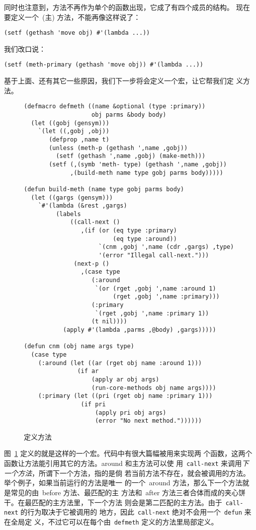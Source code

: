 同时也注意到，方法不再作为单个的函数出现，它成了有四个成员的结构。
现在要定义一个~(主) 方法，不能再像这样说了：
\begin{lstlisting}
(setf (gethash 'move obj) #'(lambda ...))
\end{lstlisting}
我们改口说：
\begin{lstlisting}
(setf (meth-primary (gethash 'move obj)) #'(lambda ...))
\end{lstlisting}
基于上面、还有其它一些原因，我们下一步将会定义一个宏，让它帮我们定
义方法。
\begin{figure}
\begin{lstlisting}
(defmacro defmeth ((name &optional (type :primary))
                   obj parms &body body)
  (let ((gobj (gensym)))
    `(let ((,gobj ,obj))
       (defprop ,name t)
       (unless (meth-p (gethash ',name ,gobj))
         (setf (gethash ',name ,gobj) (make-meth)))
       (setf (,(symb 'meth- type) (gethash ',name ,gobj))
             ,(build-meth name type gobj parms body)))))

(defun build-meth (name type gobj parms body)
  (let ((gargs (gensym)))
    `#'(lambda (&rest ,gargs)
         (labels
             ((call-next ()
                ,(if (or (eq type :primary)
                         (eq type :around))
                     `(cnm ,gobj ',name (cdr ,gargs) ,type)
                     '(error "Illegal call-next.")))
              (next-p ()
                ,(case type
                   (:around
                    `(or (rget ,gobj ',name :around 1)
                         (rget ,gobj ',name :primary)))
                   (:primary
                    `(rget ,gobj ',name :primary 1))
                   (t nil))))
           (apply #'(lambda ,parms ,@body) ,gargs)))))

(defun cnm (obj name args type)
  (case type
    (:around (let ((ar (rget obj name :around 1)))
               (if ar
                   (apply ar obj args)
                   (run-core-methods obj name args))))
    (:primary (let ((pri (rget obj name :primary 1)))
                (if pri
                    (apply pri obj args)
                    (error "No next method."))))))
\end{lstlisting}
\caption{\label{fig:defining_methods}定义方法}
\end{figure}

图~\ref{fig:defining_methods} 定义的就是这样的一个宏。代码中有很大篇幅被用来实现两
个函数，这两个函数让方法能引用其它的方法。around 和主方法可以使
用~\texttt{call-next} 来调用\emph{下一个方法}，所谓下一个方法，指的是倘
若当前方法不存在，就会被调用的方法。举个例子，如果当前运行的方法是唯一
的一个~around 方法，那么下一个方法就是常见的由~before 方法、最匹配的主
方法和~after 方法三者合体而成的夹心饼干。在最匹配的主方法里，下一个方法
则会是第二匹配的主方法。由于~\texttt{call-next} 的行为取决于它被调用的
地方，因此~\texttt{call-next} 绝对不会用一个~\texttt{defun} 来在全局定
义，不过它可以在每个由~\texttt{defmeth} 定义的方法里局部定义。

